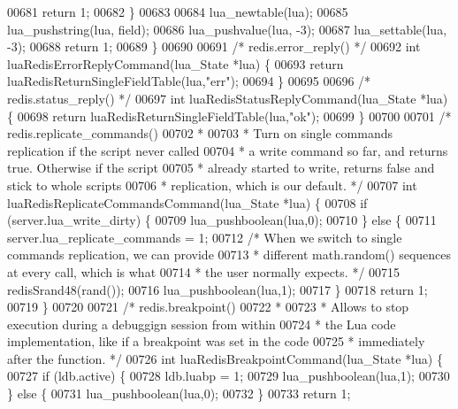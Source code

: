 \begin{DoxyCode}
{{{{{{{00681         \textcolor{keywordflow}{return} 1;
00682     \}
00683 
00684     lua\_newtable(lua);
00685     lua\_pushstring(lua, field);
00686     lua\_pushvalue(lua, -3);
00687     lua\_settable(lua, -3);
00688     \textcolor{keywordflow}{return} 1;
00689 \}
00690 
00691 \textcolor{comment}{/* redis.error\_reply() */}
00692 \textcolor{keywordtype}{int} luaRedisErrorReplyCommand(lua\_State *lua) \{
00693     \textcolor{keywordflow}{return} luaRedisReturnSingleFieldTable(lua,\textcolor{stringliteral}{"err"});
00694 \}
00695 
00696 \textcolor{comment}{/* redis.status\_reply() */}
00697 \textcolor{keywordtype}{int} luaRedisStatusReplyCommand(lua\_State *lua) \{
00698     \textcolor{keywordflow}{return} luaRedisReturnSingleFieldTable(lua,\textcolor{stringliteral}{"ok"});
00699 \}
00700 
00701 \textcolor{comment}{/* redis.replicate\_commands()}
00702 \textcolor{comment}{ *}
00703 \textcolor{comment}{ * Turn on single commands replication if the script never called}
00704 \textcolor{comment}{ * a write command so far, and returns true. Otherwise if the script}
00705 \textcolor{comment}{ * already started to write, returns false and stick to whole scripts}
00706 \textcolor{comment}{ * replication, which is our default. */}
00707 \textcolor{keywordtype}{int} luaRedisReplicateCommandsCommand(lua\_State *lua) \{
00708     \textcolor{keywordflow}{if} (server.lua\_write\_dirty) \{
00709         lua\_pushboolean(lua,0);
00710     \} \textcolor{keywordflow}{else} \{
00711         server.lua\_replicate\_commands = 1;
00712         \textcolor{comment}{/* When we switch to single commands replication, we can provide}
00713 \textcolor{comment}{         * different math.random() sequences at every call, which is what}
00714 \textcolor{comment}{         * the user normally expects. */}
00715         redisSrand48(rand());
00716         lua\_pushboolean(lua,1);
00717     \}
00718     \textcolor{keywordflow}{return} 1;
00719 \}
00720 
00721 \textcolor{comment}{/* redis.breakpoint()}
00722 \textcolor{comment}{ *}
00723 \textcolor{comment}{ * Allows to stop execution during a debuggign session from within}
00724 \textcolor{comment}{ * the Lua code implementation, like if a breakpoint was set in the code}
00725 \textcolor{comment}{ * immediately after the function. */}
00726 \textcolor{keywordtype}{int} luaRedisBreakpointCommand(lua\_State *lua) \{
00727     \textcolor{keywordflow}{if} (ldb.active) \{
00728         ldb.luabp = 1;
00729         lua\_pushboolean(lua,1);
00730     \} \textcolor{keywordflow}{else} \{
00731         lua\_pushboolean(lua,0);
00732     \}
00733     \textcolor{keywordflow}{return} 1;
}}}}}}}
\end{DoxyCode}
